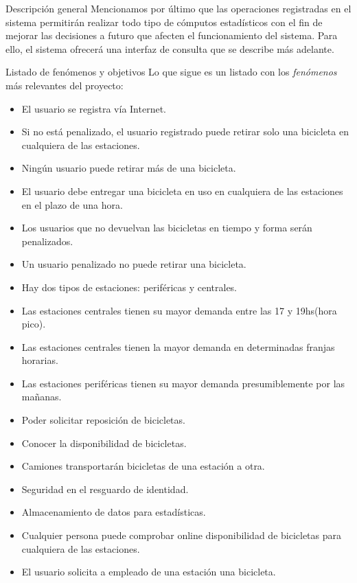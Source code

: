 \begin{subsection}{Descripción general}
Mencionamos por último que las operaciones registradas en el sistema permitirán realizar todo tipo de cómputos estadísticos con el fin de mejorar las decisiones a futuro que afecten el funcionamiento del sistema. Para ello, el sistema ofrecerá una interfaz de consulta que se describe más adelante.

\end{subsection}

\begin{subsection}{Listado de fenómenos y objetivos}
Lo que sigue es un listado con los \emph{fenómenos} más relevantes del proyecto:

\begin{itemize}
\item El usuario se registra vía Internet.
\item Si no está penalizado, el usuario registrado puede retirar solo una bicicleta en cualquiera de las estaciones.
\item Ningún usuario puede retirar más de una bicicleta.
\item El usuario debe entregar una bicicleta en uso en cualquiera de las estaciones en el plazo de una hora.
\item Los usuarios que no devuelvan las bicicletas en tiempo y forma serán penalizados.
\item Un usuario penalizado no puede retirar una bicicleta.
\item Hay dos tipos de estaciones: periféricas y centrales.
\item Las estaciones centrales tienen su mayor demanda entre las 17 y 19hs(hora pico).
\item Las estaciones centrales tienen la mayor demanda en determinadas franjas horarias.
\item Las estaciones periféricas tienen su mayor demanda presumiblemente por las mañanas.
\item Poder solicitar reposición de bicicletas.
\item Conocer la disponibilidad de bicicletas.
\item Camiones transportarán bicicletas de una estación a otra.
\item Seguridad en el resguardo de identidad.
\item Almacenamiento de datos para estadísticas.
\item Cualquier persona puede comprobar online disponibilidad de bicicletas para cualquiera de las estaciones.
\item El usuario solicita a empleado de una estación una bicicleta.

\end{itemize}
\end{subsection}
